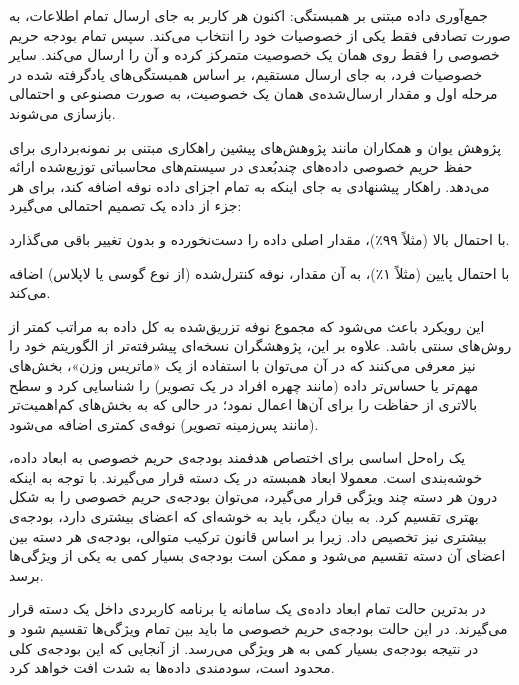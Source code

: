  جمع‌آوری داده مبتنی بر همبستگی: اکنون هر کاربر به جای ارسال تمام اطلاعات، به صورت تصادفی فقط یکی از خصوصیات خود را انتخاب می‌کند. سپس تمام بودجه حریم خصوصی را فقط روی همان یک خصوصیت متمرکز کرده و آن را ارسال می‌کند. سایر خصوصیات فرد، به جای ارسال مستقیم، بر اساس همبستگی‌های یادگرفته شده در مرحله اول و مقدار ارسال‌شده‌ی همان یک خصوصیت، به صورت مصنوعی و احتمالی بازسازی می‌شوند.



پژوهش یوان و همکاران  مانند پژوهش‌های پیشین راهکاری مبتنی بر نمونه‌برداری برای حفظ حریم خصوصی داده‌های چندبُعدی در سیستم‌های محاسباتی توزیع‌شده ارائه می‌دهد. راهکار پیشنهادی به جای اینکه به تمام اجزای داده نوفه اضافه کند، برای هر جزء از داده یک تصمیم احتمالی می‌گیرد:


 با احتمال بالا (مثلاً ۹۹٪)، مقدار اصلی داده را دست‌نخورده و بدون تغییر باقی می‌گذارد.

 با احتمال پایین (مثلاً ۱٪)، به آن مقدار، نوفه کنترل‌شده (از نوع گوسی یا لاپلاس) اضافه می‌کند.


این رویکرد باعث می‌شود که مجموع نوفه تزریق‌شده به کل داده به مراتب کمتر از روش‌های سنتی باشد. علاوه بر این، پژوهشگران نسخه‌ای پیشرفته‌تر از الگوریتم خود را نیز معرفی می‌کنند که در آن می‌توان با استفاده از یک «ماتریس وزن»، بخش‌های مهم‌تر یا حساس‌تر داده (مانند چهره افراد در یک تصویر) را شناسایی کرد و سطح بالاتری از حفاظت را برای آن‌ها اعمال نمود؛ در حالی که به بخش‌های کم‌اهمیت‌تر (مانند پس‌زمینه تصویر) نوفه‌ی کمتری اضافه می‌شود.



یک راه‌حل اساسی برای اختصاص هدفمند بودجه‌ی حریم خصوصی به ابعاد داده، خوشه‌بندی است. معمولا ابعاد همبسته در یک دسته قرار می‌گیرند. با توجه به اینکه درون هر دسته چند ویژگی قرار می‌گیرد، می‌توان بودجه‌ی حریم خصوصی را به شکل بهتری تقسیم کرد. به بیان دیگر، باید به خوشه‌ای که اعضای بیشتری‌ دارد، بودجه‌ی بیشتری نیز تخصیص داد. زیرا بر اساس قانون ترکیب متوالی، بودجه‌ی هر دسته بین اعضای آن دسته تقسیم می‌شود و ممکن است بودجه‌ی بسیار کمی به یکی از ویژگی‌ها برسد. 

در بدترین حالت تمام ابعاد داده‌ی یک سامانه یا برنامه کاربردی داخل یک دسته قرار می‌گیرند. در این حالت بودجه‌ی حریم خصوصی ما باید بین تمام ویژگی‌ها تقسیم شود و در نتیجه بودجه‌ی بسیار کمی به هر ویژگی می‌رسد. از آنجایی که این بودجه‌ی کلی محدود است، سودمندی داده‌ها به شدت افت خواهد کرد.

